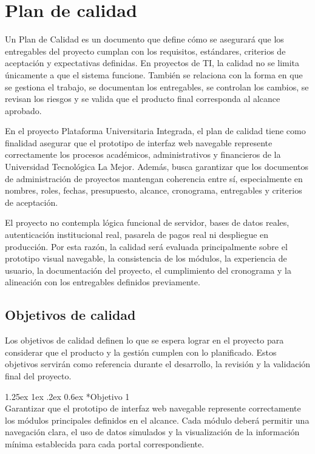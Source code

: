 \documentclass[11pt,spanish]{article}
\makeatletter
\renewcommand\paragraph{\@startsection{paragraph}{4}{\z@}%
  {1.25ex \@plus1ex \@minus.2ex}%
  {0.6ex}%
  {\normalfont\normalsize\bfseries}}
\makeatother
\begin{document}
\section{Plan de calidad}

Un Plan de Calidad es un documento que define cómo se asegurará que los entregables del proyecto cumplan con los requisitos, estándares, criterios de aceptación y expectativas definidas. En proyectos de TI, la calidad no se limita únicamente a que el sistema funcione. También se relaciona con la forma en que se gestiona el trabajo, se documentan los entregables, se controlan los cambios, se revisan los riesgos y se valida que el producto final corresponda al alcance aprobado.

En el proyecto Plataforma Universitaria Integrada, el plan de calidad tiene como finalidad asegurar que el prototipo de interfaz web navegable represente correctamente los procesos académicos, administrativos y financieros de la Universidad Tecnológica La Mejor. Además, busca garantizar que los documentos de administración de proyectos mantengan coherencia entre sí, especialmente en nombres, roles, fechas, presupuesto, alcance, cronograma, entregables y criterios de aceptación.

El proyecto no contempla lógica funcional de servidor, bases de datos reales, autenticación institucional real, pasarela de pagos real ni despliegue en producción. Por esta razón, la calidad será evaluada principalmente sobre el prototipo visual navegable, la consistencia de los módulos, la experiencia de usuario, la documentación del proyecto, el cumplimiento del cronograma y la alineación con los entregables definidos previamente.

\subsection{Objetivos de calidad}

Los objetivos de calidad definen lo que se espera lograr en el proyecto para considerar que el producto y la gestión cumplen con lo planificado. Estos objetivos servirán como referencia durante el desarrollo, la revisión y la validación final del proyecto.

\paragraph*{Objetivo 1}\mbox{}\\
Garantizar que el prototipo de interfaz web navegable represente correctamente los módulos principales definidos en el alcance. Cada módulo deberá permitir una navegación clara, el uso de datos simulados y la visualización de la información mínima establecida para cada portal correspondiente.
\end{document}
